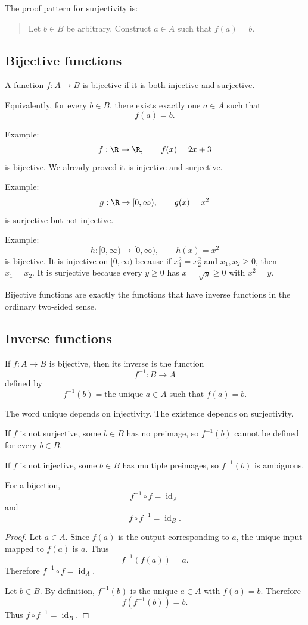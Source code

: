 The proof pattern for surjectivity is:

\begin{quote}
Let $b\in B$ be arbitrary. Construct $a\in A$ such that $f(a)=b$.
\end{quote}

\subsection{Bijective functions}

\begin{formalbox}
A function $f:A\to B$ is bijective if it is both injective and surjective.
\end{formalbox}

Equivalently, for every $b\in B$, there exists exactly one $a\in A$ such that
\[
f(a)=b.
\]

Example:
\[
f:\R\to\R,\qquad f(x)=2x+3
\]
is bijective. We already proved it is injective and surjective.

Example:
\[
g:\R\to[0,\infty),\qquad g(x)=x^2
\]
is surjective but not injective.

Example:
\[
h:[0,\infty)\to[0,\infty),\qquad h(x)=x^2
\]
is bijective. It is injective on $[0,\infty)$ because if $x_1^2=x_2^2$ and $x_1,x_2\geq0$, then $x_1=x_2$. It is surjective because every $y\geq0$ has $x=\sqrt y\geq0$ with $x^2=y$.

Bijective functions are exactly the functions that have inverse functions in the ordinary two-sided sense.

\subsection{Inverse functions}

If $f:A\to B$ is bijective, then its inverse is the function
\[
f^{-1}:B\to A
\]
defined by
\[
f^{-1}(b)=\text{the unique }a\in A\text{ such that }f(a)=b.
\]

The word unique depends on injectivity. The existence depends on surjectivity.

If $f$ is not surjective, some $b\in B$ has no preimage, so $f^{-1}(b)$ cannot be defined for every $b\in B$.

If $f$ is not injective, some $b\in B$ has multiple preimages, so $f^{-1}(b)$ is ambiguous.

For a bijection,
\[
f^{-1}\circ f=\operatorname{id}_A
\]
and
\[
f\circ f^{-1}=\operatorname{id}_B.
\]

\begin{proof}
Let $a\in A$. Since $f(a)$ is the output corresponding to $a$, the unique input mapped to $f(a)$ is $a$. Thus
\[
f^{-1}(f(a))=a.
\]
Therefore $f^{-1}\circ f=\operatorname{id}_A$.

Let $b\in B$. By definition, $f^{-1}(b)$ is the unique $a\in A$ with $f(a)=b$. Therefore
\[
f(f^{-1}(b))=b.
\]
Thus $f\circ f^{-1}=\operatorname{id}_B$.
\end{proof}

